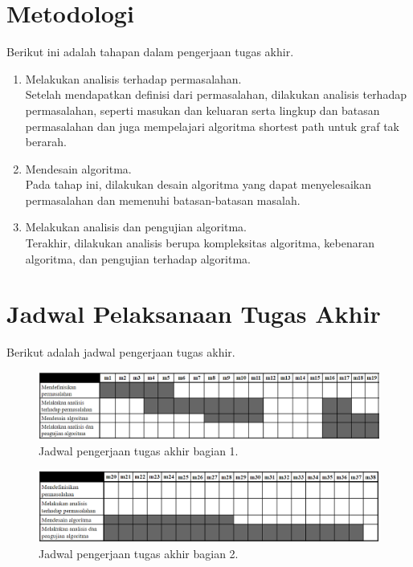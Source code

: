 \section{Metodologi}

Berikut ini adalah tahapan dalam pengerjaan tugas akhir.

\begin{enumerate}
    \item Melakukan analisis terhadap permasalahan.\\
    Setelah mendapatkan definisi dari permasalahan, dilakukan analisis terhadap permasalahan, seperti masukan dan keluaran serta lingkup dan batasan permasalahan dan juga mempelajari algoritma shortest path untuk graf tak berarah.
    \item Mendesain algoritma.\\
    Pada tahap ini, dilakukan desain algoritma yang dapat menyelesaikan permasalahan dan memenuhi batasan-batasan masalah.
    \item Melakukan analisis dan pengujian algoritma.\\
    Terakhir, dilakukan analisis berupa kompleksitas algoritma, kebenaran algoritma, dan pengujian terhadap algoritma.
\end{enumerate}

\section{Jadwal Pelaksanaan Tugas Akhir}

Berikut adalah jadwal pengerjaan tugas akhir.

\begin{figure}[H]
    \centering
    \includegraphics[width=1.0\textwidth]{resources/jadwal1.png}
    \caption{Jadwal pengerjaan tugas akhir bagian 1.}
\end{figure}

\begin{figure}[H]
    \centering
    \includegraphics[width=1.0\textwidth]{resources/jadwal2.png}
    \caption{Jadwal pengerjaan tugas akhir bagian 2.}
\end{figure}

